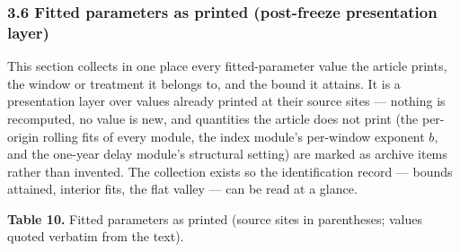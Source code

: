 \documentclass[11pt]{article}
\begin{document}
\subsubsection{3.6 Fitted parameters as printed (post-freeze
presentation
layer)}\label{fitted-parameters-as-printed-post-freeze-presentation-layer}

This section collects in one place every fitted-parameter value the
article prints, the window or treatment it belongs to, and the bound it
attains. It is a presentation layer over values already printed at their
source sites --- nothing is recomputed, no value is new, and quantities
the article does not print (the per-origin rolling fits of every module,
the index module's per-window exponent \(b\), and the one-year delay
module's structural setting) are marked as archive items rather than
invented. The collection exists so the identification record --- bounds
attained, interior fits, the flat valley --- can be read at a glance.

\textbf{Table 10.} Fitted parameters as printed (source sites in
parentheses; values quoted verbatim from the text).
\end{document}
